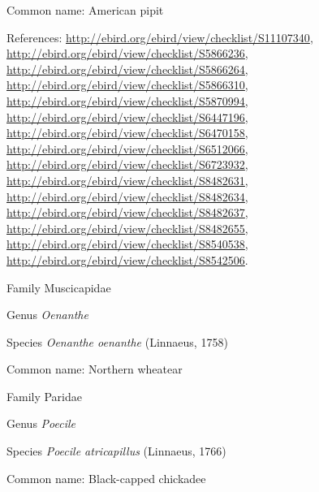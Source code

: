 \documentclass[9pt, article]{memoir}
\begin{document}
\begin{multicols}{2}
Common name: American pipit

References: 
\url{http://ebird.org/ebird/view/checklist/S11107340}, 
\url{http://ebird.org/ebird/view/checklist/S5866236}, 
\url{http://ebird.org/ebird/view/checklist/S5866264}, 
\url{http://ebird.org/ebird/view/checklist/S5866310}, 
\url{http://ebird.org/ebird/view/checklist/S5870994}, 
\url{http://ebird.org/ebird/view/checklist/S6447196}, 
\url{http://ebird.org/ebird/view/checklist/S6470158}, 
\url{http://ebird.org/ebird/view/checklist/S6512066}, 
\url{http://ebird.org/ebird/view/checklist/S6723932}, 
\url{http://ebird.org/ebird/view/checklist/S8482631}, 
\url{http://ebird.org/ebird/view/checklist/S8482634}, 
\url{http://ebird.org/ebird/view/checklist/S8482637}, 
\url{http://ebird.org/ebird/view/checklist/S8482655}, 
\url{http://ebird.org/ebird/view/checklist/S8540538}, 
\url{http://ebird.org/ebird/view/checklist/S8542506}.

\vspace{6pt}\noindent\hspace{24pt}Family Muscicapidae


\vspace{6pt}\noindent\hspace{30pt}Genus \textit{Oenanthe}


\vspace{6pt}\noindent\hspace{36pt}Species \textit{Oenanthe oenanthe} (Linnaeus, 1758)


Common name: Northern wheatear

\vspace{6pt}\noindent\hspace{24pt}Family Paridae


\vspace{6pt}\noindent\hspace{30pt}Genus \textit{Poecile}


\vspace{6pt}\noindent\hspace{36pt}Species \textit{Poecile atricapillus} (Linnaeus, 1766)


Common name: Black-capped chickadee


\end{multicols}
\end{document}
